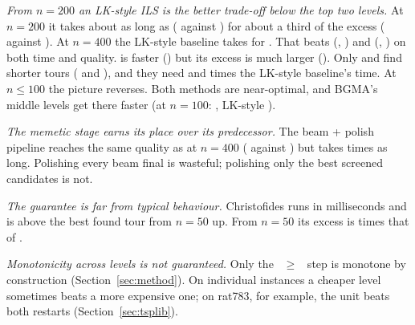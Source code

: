 \emph{From $n=200$ an LK-style ILS is the better trade-off below the top two levels.} At $n=200$ it
takes about as long as  ( against ) for about a
third of the excess ( against ). At $n=400$ the LK-style baseline takes
 for . That beats  (, ) and 
(, ) on both time and quality.  is faster
() but its excess is much larger (). Only  and  find shorter tours ( and
), and they need  and  times the LK-style
baseline's time. At $n\le 100$ the picture reverses. Both methods are near-optimal, and BGMA's middle
levels get there faster (at $n=100$:  , LK-style ).

\emph{The memetic stage earns its place over its predecessor.} The beam + polish pipeline reaches the
same quality as  at $n=400$ ( against ) but takes
 times as long. Polishing every beam final is wasteful; polishing only the best
screened candidates is not.

\emph{The guarantee is far from typical behaviour.} Christofides runs in milliseconds and is
 above the best found tour from $n=50$ up. From $n=50$ its
excess is  times that of .

\emph{Monotonicity across levels is not guaranteed.} Only the ~$\ge$~ step is
monotone by construction (Section~\ref{sec:method}). On individual instances a cheaper level sometimes
beats a more expensive one; on rat783, for example, the  unit beats both  restarts (Section~\ref{sec:tsplib}).
